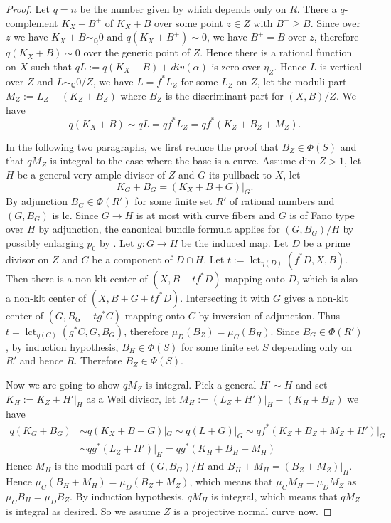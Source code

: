 \documentclass[letterpaper,reqno,12pt]{amsart}
\DeclareMathOperator{\lct}{lct}
\numberwithin{equation}{section}
\theoremstyle{plain}
\begin{document}
\begin{proof}
    Let $q=n$ be the number given by  which depends only on $ R$. There a $q$-complement $K_X+B^+$ of $K_X+B$ over some point $z\in Z$ with $B^+\geq B$. Since over $z$ we have $K_X+B\sim_{\mathbb Q}0$ and $q(K_X+B^+)\sim 0$, we have $B^+=B$ over $z$, therefore $q(K_X+B)\sim 0$ over the generic point of $Z$. Hence there is a rational function on $X$ such that $qL:=q(K_X+B)+div(\alpha)$ is zero over $\eta_Z$. Hence $L$ is vertical over $Z$ and $L\sim_{\mathbb Q} 0/Z$, we have $L=f^*L_Z$ for some $L_Z$ on $Z$, let the moduli part $M_Z:=L_Z-(K_Z+B_Z)$ where $B_Z$ is the discriminant part for $(X,B)/Z$. We have \[q(K_X+B)\sim qL=qf^*L_Z=qf^*(K_Z+B_Z+M_Z).\]

    In the following two paragraphs, we first reduce the proof that $B_{Z}\in\Phi(S)$ and that $qM_{Z}$ is integral to the case where the base is a curve. Assume dim $Z>1$, let $H$ be a general very ample divisor of $Z$ and $G$ its pullback to $X$, let \[K_G+B_G=(K_X+B+G)|_G.\] By adjunction $B_G\in\Phi(R')$ for some finite set $R'$ of rational numbers and $(G,B_G)$ is lc. Since $G\to H$ is at most with curve fibers and $G$ is of Fano type over $H$ by adjunction, the canonical bundle formula applies for $(G,B_G)/H$ by possibly enlarging $p_0$ by . Let $g:G\to H$ be the induced map. Let $D$ be a prime divisor on $Z$ and $C$ be a component of $D\cap H$. Let $t:=\lct_{\eta(D)}(f^*D,X,B)$. Then there is a non-klt center of $(X,B+tf^*D)$ mapping onto $D$, which is also a non-klt center of $(X,B+G+tf^*D)$. Intersecting it with $G$ gives a non-klt center of $(G,B_G+tg^*C)$ mapping onto $C$ by inversion of adjunction. Thus $t=\lct_{\eta(C)}(g^*C,G,B_G)$, therefore $\mu_D(B_Z)=\mu_C(B_H)$. Since $B_G\in \Phi(R')$, by induction hypothesis, $B_H\in\Phi(S)$ for some finite set $S$ depending only on $R'$ and hence $R$. Therefore $B_Z\in\Phi(S)$.
    
    Now we are going to show $qM_Z$ is integral. Pick a general $H'\sim H$ and set $K_H:=K_Z+H'|_H$ as a Weil divisor, let $M_H:=(L_Z+H')|_H-(K_H+B_H)$ we have \[\begin{aligned}q(K_G+B_G)&\sim q(K_X+B+G)|_G\sim q(L+G)|_G\sim qf^*(K_Z+B_Z+M_Z+H')|_G\\&\sim qg^*(L_Z+H')|_H=qg^*(K_H+B_H+M_H)\end{aligned}\]
    Hence $M_H$ is the moduli part of $(G,B_G)/H$ and $B_H+M_H=(B_Z+M_Z)|_H$. Hence $\mu_C(B_H+M_H)=\mu_D(B_Z+M_Z)$, which means that $\mu_CM_H=\mu_DM_Z$ as $\mu_CB_H=\mu_DB_Z$. By induction hypothesis, $qM_H$ is integral, which means that $qM_Z$ is integral as desired. So we assume $Z$ is a projective normal curve now.
    

\end{proof}
\end{document}

